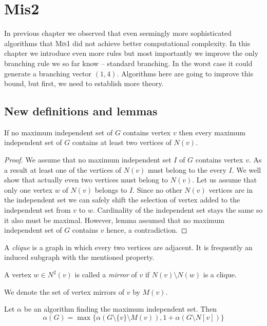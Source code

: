 \section{Mis2}

In previous chapter we observed that even seemingly more sophisticated algorithms that \textsc{Mis1} did not achieve better computational complexity. In this chapter we introduce even more rules but most importantly we improve the only branching rule we so far know -- standard branching. In the worst case it could generate a branching vector $(1,4)$. Algorithms here are going to improve this bound, but first, we need to establish more theory.

\subsection{New definitions and lemmas}

\begin{lemma}
\label{lem:lem1}
If no maximum independent set of $G$ contains vertex $v$ then every maximum independent set of $G$ contains at least two vertices of $N(v)$.
\end{lemma}
\begin{proof}
We assume that no maximum independent set $I$ of $G$ contains vertex $v$. As a result at least one of the vertices of $N(v)$ must belong to the every $I$. We well show that actually even two vertices must belong to $N(v)$. Let us assume that only one vertex $w$ of $N(v)$ belongs to $I$. Since no other $N(v)$ vertices are in the independent set we can safely shift the selection of vertex added to the independent set from $v$ to $w$. Cardinality of the independent set stays the same so it also must be maximal. However, lemma assumed that no maximum independent set of $G$ contains $v$ hence, a contradiction.
\end{proof}

\begin{defn}[clique]
A \emph{clique} is a graph in which every two vertices are adjacent. It is frequently an induced subgraph with the mentioned property.
\end{defn}

\begin{defn}
\label{def:mirror}
A vertex $w \in N^2(v)$ is called a \emph{mirror} of $v$ if $N(v) \setminus N(w)$ is a clique. 
\end{defn}
We denote the set of vertex mirrors of $v$ by $M(v)$.

\begin{lemma}
\label{lem:mirror_branching}
Let $\alpha$ be an algorithm finding the maximum independent set. Then
$$\alpha(G) = \max\{\alpha(G\setminus \{v\} \setminus M(v)),1+\alpha(G\setminus N[v])\}$$
\end{lemma}

